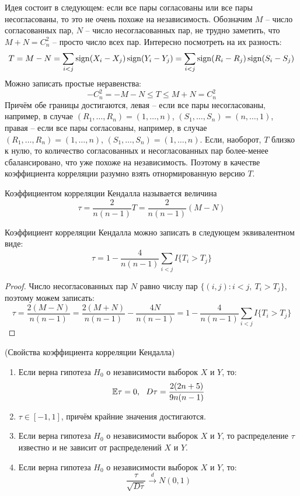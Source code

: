 \begin{note}
    Идея состоит в следующем: если все пары согласованы или все пары несогласованы, то это не очень похоже на независимость. Обозначим $M$ -- число согласованных пар, $N$ -- число несогласованных пар, не трудно заметить, что $M + N = C_n^2$ -- просто число всех пар. Интересно посмотреть на их разность:
    \[
        T = M - N = \sum_{i < j} \operatorname{sign}(X_i - X_j) \operatorname{sign}(Y_i - Y_j) = \sum_{i < j} \operatorname{sign}(R_i - R_j) \operatorname{sign}(S_i - S_j)
    \]
    Можно записать простые неравенства:
    \[
        -C_n^2 = -M - N \le T \le M + N = C_n^2
    \]
    Причём обе границы достигаются, левая -- если все пары несогласованы, например, в случае $(R_1, \dots, R_n) = (1, \dots, n)$, $(S_1, \dots, S_n) = (n, \dots, 1)$, правая -- если все пары согласованы, например, в случае $(R_1, \dots, R_n) = (1, \dots, n)$, $(S_1, \dots, S_n) = (1, \dots, n)$. Если, наоборот, $T$ близко к нулю, то количество согласованных и несогласованных пар более-менее сбалансировано, что уже похоже на независимость. Поэтому в качестве коэффициента корреляции разумно взять отнормированную версию $T$.
\end{note}

\begin{definition}
    Коэффициентом корреляции Кендалла называется величина
    \[
        \tau = \frac{2}{n(n-1)} T = \frac{2}{n(n-1)} (M - N)
    \]
\end{definition}

\begin{proposition}
    Коэффициент корреляции Кендалла можно записать в следующем эквивалентном виде:
    \[
        \tau = 1 - \frac{4}{n(n-1)} \sum_{i < j} I\{T_i > T_j\}
    \]
\end{proposition}

\begin{proof}
    Число несогласованных пар $N$ равно числу пар $\{(i, j) \colon i < j,\ T_i > T_j\}$, поэтому можем записать:
    \[
        \tau = \frac{2(M-N)}{n(n-1)} = \frac{2(M+N)}{n(n-1)} - \frac{4N}{n(n-1)} = 1 - \frac{4}{n(n-1)} \sum_{i < j} I\{T_i > T_j\}
    \]
\end{proof}

\begin{proposition} (Свойства коэффициента корреляции Кендалла)
    \begin{enumerate}
        \item Если верна гипотеза $H_0$ о независимости выборок $X$ и $Y$, то:
        \[
            \mathbb{E} \tau = 0,\ \ D \tau = \frac{2(2n+5)}{9n(n-1)}
        \]

        \item $\tau \in [-1, 1]$, причём крайние значения достигаются.

        \item Если верна гипотеза $H_0$ о независимости выборок $X$ и $Y$, то распределение $\tau$ известно и не зависит от распределений $X$ и $Y$.

        \item Если верна гипотеза $H_0$ о независимости выборок $X$ и $Y$, то:
        \[
            \frac{\tau}{\sqrt{D \tau}} \xrightarrow{d} N(0, 1)
        \]
    \end{enumerate}
\end{proposition}


